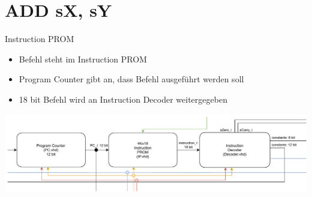 \documentclass[10pt, t,
aspectratio=169,%
usenames,
dvipsnames,
]{beamer}
\begin{document}
	\section{ADD sX, sY}
	\begin{frame}{Instruction PROM}
		\begin{itemize}
			\item Befehl steht im Instruction PROM
			\item Program Counter gibt an, dass Befehl ausgeführt werden soll
			\item 18 bit Befehl wird an Instruction Decoder weitergegeben
		\end{itemize}
		\includegraphics[width=1.0\linewidth]{../Blockbeschreibungen/PC-IDBlockdiagramSnipits.pdf}
	\end{frame}
\end{document}
